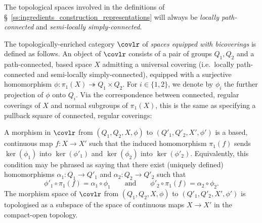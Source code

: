 \documentclass[AHL,Unicode,published]{cedram}
\begin{document}
\begin{rema}
The topological spaces involved in the definitions of \S~\ref{ss:ingredients_construction_representations} will always be \emph{locally path-connected} and \emph{semi-locally simply-connected}.
\end{rema}

\begin{defi}\label{def:bicoverings}
The topologically-enriched category $\covlr$ of \emph{spaces equipped with bicoverings} is defined as follows. An object of $\covlr$ consists of a pair of groups $Q_{1},Q_{2}$ and a path-connected, based space $X$ admitting a universal covering (i.e.~locally path-connected and semi-locally simply-connected), equipped with a surjective homomorphism $\phi\colon \pi_{1}(X) \twoheadrightarrow Q_{1} \times Q_{2}$. For $i\in\{1,2\}$, we denote by $\phi_{i}$ the further projection of $\phi$ onto $Q_{i}$. Via the correspondence between connected, regular coverings of $X$ and normal subgroups of $\pi_{1}(X)$, this is the same as specifying a pullback square of connected, regular coverings:
\begin{center}
\end{center} A morphism in $\covlr$ from $(Q_{1},Q_{2},X,\phi)$ to $(Q'_{1},Q'_{2},X',\phi')$ is a based, continuous map $f \colon X \to X'$ such that the induced homomorphism $\pi_{1}(f)$ sends $\ker(\phi_{1})$ into $\ker(\phi'_{1})$ and $\ker(\phi_{2})$ into $\ker(\phi'_{2})$. Equivalently, this condition may be phrased as saying that there exist (uniquely defined) homomorphisms $\alpha_{1} \colon Q_{1} \to Q'_{1}$ and $\alpha_{2} \colon Q_{2} \to Q'_{2}$ such that
\[
\phi'_{1} \circ \pi_{1}(f) = \alpha_{1} \circ \phi_{1} \qquad\text{and}\qquad \phi'_{2} \circ \pi_{1}(f) = \alpha_{2} \circ \phi_{2}.
\]
The morphism space of $\covlr$ from $(Q_{1},Q_{2},X,\phi)$ to $(Q'_{1},Q'_{2},X',\phi')$ is topologised as a subspace of the space of continuous maps $X \to X'$ in the compact-open topology.


\end{defi}
\end{document}
